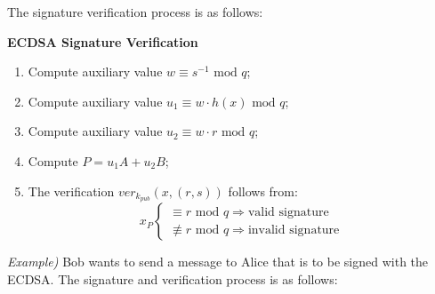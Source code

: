 \documentclass[11pt, a4paper]{article}
\newcommand{\mymod}{
    \text{ mod }
}
\begin{document}
\newpage
\hfill\break
The signature verification process is as follows:
\begin{framed}
    \hfill\break\textbf{ECDSA Signature Verification}
    \begin{enumerate}
        \item Compute auxiliary value $w\equiv s^{-1}\mymod q$;
        \item Compute auxiliary value $u_1\equiv w\cdot h(x)\mymod q$;
        \item Compute auxiliary value $u_2\equiv w\cdot r\mymod q$;
        \item Compute $P=u_1A+u_2B$;
        \item The verification $ver_{k_{pub}}(x,(r,s))$ follows from:
        \begin{equation*}
            x_P\begin{cases}
                \equiv r\mymod q\Longrightarrow\text{valid signature}\\
                \not\equiv r\mymod q\Longrightarrow\text{invalid signature}
            \end{cases}
        \end{equation*}
    \end{enumerate}
\end{framed}
\hfill\break
\textit{Example)} Bob wants to send a message to Alice that is to be signed with the ECDSA. The signature and verification process is as follows:
\end{document}
